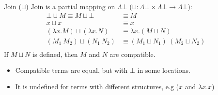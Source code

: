 \begin{definitionbox}{Join ($\sqcup$)}
    Join is a partial mapping on $\Lambda \bot$ ($\sqcup : \Lambda \bot \times \Lambda \bot \to \Lambda \bot$):
    \[\begin{split}
        \bot \sqcup M \equiv M \sqcup \bot & \equiv M \\
        x \sqcup x & \equiv x \\
        (\lambda x . M) \sqcup (\lambda x . N) & \equiv \lambda x . (M \sqcup N) \\
        (M_1 \ M_2) \sqcup (N_1 \ N_2) & \equiv (M_1 \sqcup N_1) \ (M_2 \sqcup N_2) \\
    \end{split}\]
    If $M \sqcup N$ is defined, then $M$ and $N$ are compatible.
    \begin{itemize}
        \item Compatible terms are equal, but with $\bot$ in some locations.
        \item It is undefined for terms with different structures, e.g ($x$ and $\lambda x . x$)
    \end{itemize}
\end{definitionbox}

